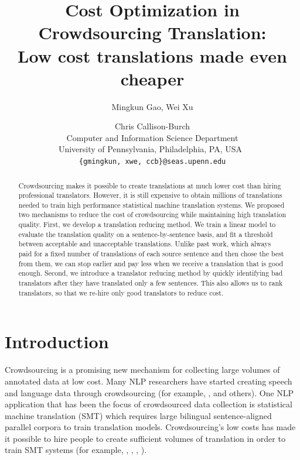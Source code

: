 \documentclass[11pt,letterpaper]{article}
\title{Cost Optimization in Crowdsourcing Translation:\\ Low cost translations made even cheaper}
\author{Mingkun Gao, Wei Xu \and Chris Callison-Burch\\
  Computer and Information Science Department\\
  University of Pennsylvania, Philadelphia, PA, USA\ \\
  {\tt \{gmingkun, xwe, ccb\}@seas.upenn.edu}
}
\date{}
\begin{document}
\maketitle
\begin{abstract}
Crowdsourcing makes it possible to create translations at much lower cost than hiring professional translators. However, it is still expensive to obtain millions of translations needed to train high performance statistical machine translation systems. We proposed two mechanisms to reduce the cost of crowdsourcing while maintaining high translation quality.
First, we develop a translation reducing method. We train a linear model to evaluate the translation quality on a sentence-by-sentence basis, and fit a threshold between acceptable and unacceptable translations. Unlike past work, which always paid for a fixed number of translations of each source sentence and then chose the best from them, we can stop earlier and pay less when we receive a translation that is good enough. Second, we introduce a translator reducing method by quickly identifying bad translators after they have translated only a few sentences. This also allows us to rank translators, so that we re-hire only good translators to reduce cost.   


 \end{abstract}

\section{Introduction}

Crowdsourcing is a promising new mechanism for collecting large volumes of annotated data at low cost.  %
Many NLP researchers have started creating speech and language data through crowdsourcing (for example,  ,  and others).  One NLP application that has been the focus of crowdsourced data collection is statistical machine translation (SMT) which requires large bilingual sentence-aligned parallel corpora to train translation models.  Crowdsourcing's low costs has made it possible to hire people to create sufficient volumes of translation in order to train SMT systems (for example,   ,  ,  , ).
\end{document}
